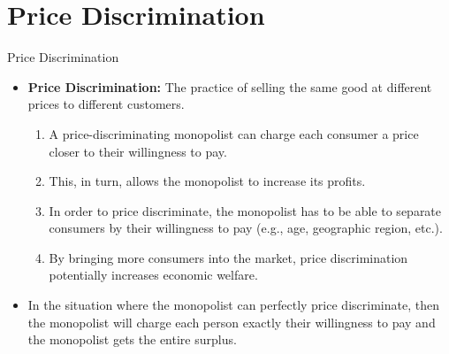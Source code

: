\documentclass[xcolor={dvipsnames},pdf, hyperref={colorlinks=true, citecolor=ForestGreen, linkcolor=BlueViolet, urlcolor=Magenta}]{beamer}
\newcommand{\defn}[1]{\textbf{#1}}
\begin{document}
\section{Price Discrimination}

\begin{frame}{Price Discrimination}
\begin{itemize}
	\item 	\defn{Price Discrimination:} The practice of selling the same good at different prices to different customers.
	
	\begin{enumerate}
		\item A price-discriminating monopolist can charge each consumer a price closer to their willingness to pay. 
		\item This, in turn, allows the monopolist to increase its profits.
		\item In order to price discriminate, the monopolist has to be able to separate consumers by their willingness to pay (e.g., age, geographic region, etc.).
		\item By bringing more consumers into the market, price discrimination potentially increases economic welfare.
	\end{enumerate}
	\item In the situation where the monopolist can perfectly price discriminate, then the monopolist will charge each person exactly their willingness to pay and the monopolist gets the entire surplus. 
\end{itemize}
\end{frame}
\end{document}
